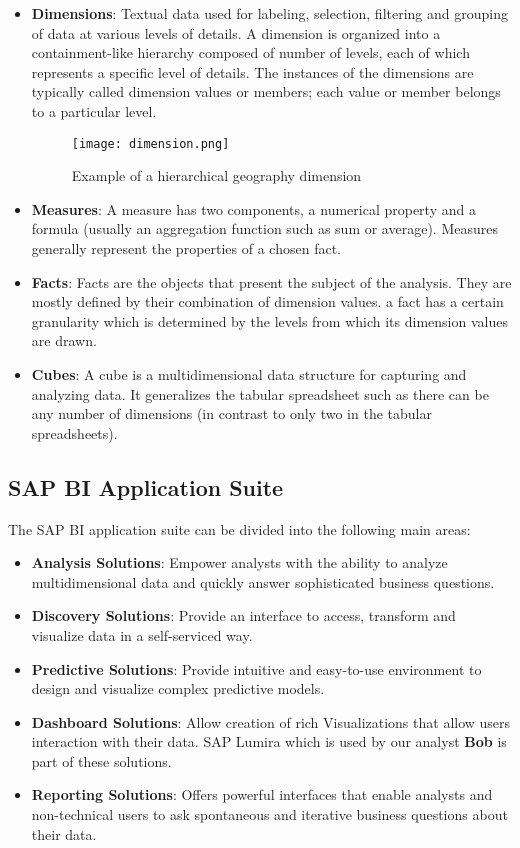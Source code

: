 \begin{itemize}
	\item \textbf{Dimensions}: Textual data used for labeling, selection, filtering and grouping of data at various levels of details. A dimension is organized into a containment-like hierarchy composed of number of levels, each of which represents a specific level of details. The instances of the dimensions are typically called dimension values or members; each value or member belongs to a particular level.

\begin{figure}[htbp]
\centering
	\texttt{[image: dimension.png]}
	\caption{Example of a hierarchical geography dimension}
	\label{fig:dimension}
\end{figure}

	\item \textbf{Measures}: A measure has two components, a numerical property and a formula (usually an aggregation function such as sum or average). Measures generally represent the properties of a chosen fact.
	\item \textbf{Facts}: Facts are the objects that present the subject of the analysis. They are mostly defined by their combination of dimension values. a fact has a certain granularity which is determined by the levels from which its dimension values are drawn.
	\item \textbf{Cubes}: A cube is a multidimensional data structure for capturing and analyzing data. It generalizes the tabular spreadsheet such as there can be any number of dimensions (in contrast to only two in the tabular spreadsheets).
\end{itemize}

\subsection{SAP BI Application Suite}

The SAP BI application suite can be divided into the following main areas:

\begin{itemize}
	\item \textbf{Analysis Solutions}: Empower analysts with the ability to analyze multidimensional data and quickly answer sophisticated business questions.
	\item \textbf{Discovery Solutions}: Provide an interface to access, transform and visualize data in a self-serviced way.
	\item \textbf{Predictive Solutions}: Provide intuitive and easy-to-use environment to design and visualize complex predictive models.
	\item \textbf{Dashboard Solutions}: Allow creation of rich Visualizations that allow users interaction with their data. SAP Lumira which is used by our analyst \textbf{Bob} is part of these solutions.
	\item \textbf{Reporting Solutions}: Offers powerful interfaces that enable analysts and non-technical users to ask spontaneous and iterative business questions about their data.
\end{itemize}

